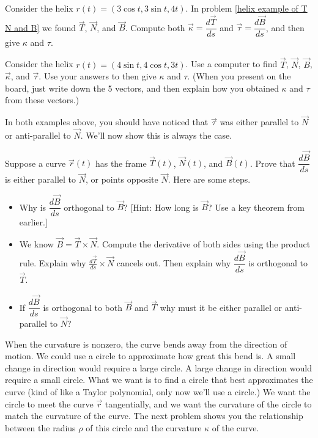 \begin{problem}
%
Consider the helix $r(t)=(3\cos t, 3\sin t, 4t)$. In problem \ref{helix example of T N and B} we found $\vec T$, $\vec N$, and $\vec B$. Compute both $\vec \kappa=\dfrac{d\vec T}{ds}$ and $\vec \tau=\dfrac{d\vec B}{ds}$, and then give $\kappa$ and $\tau$.
\end{problem}

\begin{problem}
 Consider the helix $r(t)=(4\sin t, 4\cos t, 3t)$. Use a computer to find $\vec T$, $\vec N$, $\vec B$, $\vec \kappa$, and $\vec \tau$. Use your answers to then give $\kappa$ and $\tau$. (When you present on the board, just write down the 5 vectors, and then explain how you obtained $\kappa$ and $\tau$ from these vectors.)
\end{problem}

In both examples above, you should have noticed that $\vec \tau$ was either parallel to $\vec N$ or anti-parallel to $\vec N$.  We'll now show this is always the case.

\begin{problem}%
 Suppose a curve $\vec r(t)$ has the frame $\vec T(t)$, $\vec N(t)$, and $\vec B(t)$. Prove that $\dfrac{d\vec B}{ds}$ is either parallel to $\vec N$, or points opposite $\vec N$. Here are some steps.
 \begin{itemize}
  \item Why is $\dfrac{d\vec B}{ds}$ orthogonal to $\vec B$? [Hint: How long is $\vec B$? Use a key theorem from earlier.]
  \item We know $\vec B=\vec T\times \vec N$. Compute the derivative of both sides using the product rule. Explain why $\frac{d\vec T}{ds}\times \vec N$ cancels out. Then explain why $\dfrac{d\vec B}{ds}$ is orthogonal to $\vec T$.
  \item If $\dfrac{d\vec B}{ds}$ is orthogonal to both $\vec B$ and $\vec T$ why must it be either parallel or anti-parallel to $\vec N$?
 \end{itemize}
\end{problem}


When the curvature is nonzero, the curve bends away from the direction of motion.  We could use a circle to approximate how great this bend is. A small change in direction would require a large circle.  A large change in direction would require a small circle. 
What we want is to find a circle that best approximates the curve (kind of like a Taylor polynomial, only now we'll use a circle.) We want the circle to meet the curve $\vec r$ tangentially, and we want the curvature of the circle to match the curvature of the curve.  The next problem shows you the relationship between the radius $\rho$ of this circle and the curvature $\kappa$ of the curve.

